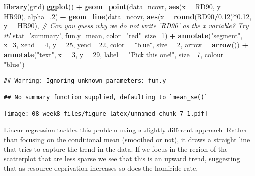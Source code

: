 \documentclass[]{book}
\newenvironment{Shaded}{\begin{snugshade}}{\end{snugshade}}
\newcommand{\CommentTok}[1]{\textcolor[rgb]{0.56,0.35,0.01}{\textit{#1}}}
\newcommand{\DataTypeTok}[1]{\textcolor[rgb]{0.13,0.29,0.53}{#1}}
\newcommand{\DecValTok}[1]{\textcolor[rgb]{0.00,0.00,0.81}{#1}}
\newcommand{\FloatTok}[1]{\textcolor[rgb]{0.00,0.00,0.81}{#1}}
\newcommand{\KeywordTok}[1]{\textcolor[rgb]{0.13,0.29,0.53}{\textbf{#1}}}
\newcommand{\NormalTok}[1]{#1}
\newcommand{\OperatorTok}[1]{\textcolor[rgb]{0.81,0.36,0.00}{\textbf{#1}}}
\newcommand{\StringTok}[1]{\textcolor[rgb]{0.31,0.60,0.02}{#1}}
\begin{document}
\begin{Shaded}
\begin{Highlighting}[]
\KeywordTok{library}\NormalTok{(grid)}
\KeywordTok{ggplot}\NormalTok{() }\OperatorTok{+}
\StringTok{  }\KeywordTok{geom_point}\NormalTok{(}\DataTypeTok{data=}\NormalTok{ncovr, }\KeywordTok{aes}\NormalTok{(}\DataTypeTok{x =}\NormalTok{ RD90, }\DataTypeTok{y =}\NormalTok{ HR90), }\DataTypeTok{alpha=}\NormalTok{.}\DecValTok{2}\NormalTok{) }\OperatorTok{+}
\KeywordTok{geom_line}\NormalTok{(}\DataTypeTok{data=}\NormalTok{ncovr, }\KeywordTok{aes}\NormalTok{(}\DataTypeTok{x =} \KeywordTok{round}\NormalTok{(RD90}\OperatorTok{/}\FloatTok{0.12}\NormalTok{)}\OperatorTok{*}\FloatTok{0.12}\NormalTok{, }\DataTypeTok{y =}\NormalTok{ HR90), }\CommentTok{# Can you guess why we do not write 'RD90' as the x variable? Try it!}
          \DataTypeTok{stat=}\StringTok{'summary'}\NormalTok{,}
          \DataTypeTok{fun.y=}\NormalTok{mean,}
          \DataTypeTok{color=}\StringTok{"red"}\NormalTok{,}
          \DataTypeTok{size=}\DecValTok{1}\NormalTok{) }\OperatorTok{+}
\StringTok{  }\KeywordTok{annotate}\NormalTok{(}\StringTok{"segment"}\NormalTok{, }\DataTypeTok{x=}\DecValTok{3}\NormalTok{, }\DataTypeTok{xend =} \DecValTok{4}\NormalTok{, }\DataTypeTok{y =} \DecValTok{25}\NormalTok{, }\DataTypeTok{yend=} \DecValTok{22}\NormalTok{, }\DataTypeTok{color =} \StringTok{"blue"}\NormalTok{, }\DataTypeTok{size =} \DecValTok{2}\NormalTok{, }\DataTypeTok{arrow =} \KeywordTok{arrow}\NormalTok{()) }\OperatorTok{+}
\StringTok{  }\KeywordTok{annotate}\NormalTok{(}\StringTok{"text"}\NormalTok{, }\DataTypeTok{x =} \DecValTok{3}\NormalTok{, }\DataTypeTok{y =} \DecValTok{29}\NormalTok{, }\DataTypeTok{label =} \StringTok{"Pick this one!"}\NormalTok{, }\DataTypeTok{size =}\DecValTok{7}\NormalTok{, }\DataTypeTok{colour =} \StringTok{"blue"}\NormalTok{)}
\end{Highlighting}
\end{Shaded}

\begin{verbatim}
## Warning: Ignoring unknown parameters: fun.y
\end{verbatim}

\begin{verbatim}
## No summary function supplied, defaulting to `mean_se()`
\end{verbatim}

\texttt{[image: 08-week8\_files/figure-latex/unnamed-chunk-7-1.pdf]}

Linear regression tackles this problem using a slightly different approach. Rather than focusing on the conditional mean (smoothed or not), it draws a straight line that tries to capture the trend in the data. If we focus in the region of the scatterplot that are less sparse we see that this is an upward trend, suggesting that as resource deprivation increases so does the homicide rate.
\end{document}

